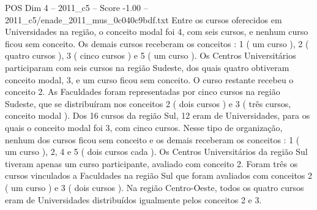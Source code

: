\begin{textsample}{POS Dim 4 – 2011\_c5 – Score -1.00 – 2011\_c5/enade\_2011\_mus\_0c040c9bdf.txt}
Entre os cursos oferecidos em Universidades na região, o conceito modal foi 4, com seis cursos, e nenhum curso ficou sem conceito.
Os demais cursos receberam os conceitos : 1 ( um curso ), 2 ( quatro cursos ), 3 ( cinco cursos ) e 5 ( um curso ).
Os Centros Universitários participaram com seis cursos na região Sudeste, dos quais quatro obtiveram conceito modal, 3, e um curso ficou sem conceito.
O curso restante recebeu o conceito 2.
As Faculdades foram representadas por cinco cursos na região Sudeste, que se distribuíram nos conceitos 2 ( dois cursos ) e 3 ( três cursos, conceito modal ).
Dos 16 cursos da região Sul, 12 eram de Universidades, para os quais o conceito modal foi 3, com cinco cursos.
Nesse tipo de organização, nenhum dos cursos ficou sem conceito e os demais receberam os conceitos : 1 ( um curso ), 2, 4 e 5 ( dois cursos cada ).
Os Centros Universitários da região Sul tiveram apenas um curso participante, avaliado com conceito 2.
Foram três os cursos vinculados a Faculdades na região Sul que foram avaliados com conceitos 2 ( um curso ) e 3 ( dois cursos ).
Na região Centro-Oeste, todos os quatro cursos eram de Universidades distribuídos igualmente pelos conceitos 2 e 3.

\end{textsample}
